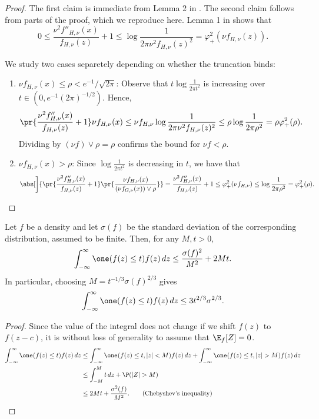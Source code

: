 \documentclass[12pt, reqno]{amsart}
\newcommand{\invphi}{\varphi_{+}}
\numberwithin{equation}{section}
\begin{document}
\begin{refsection}
\begin{appendices}
\begin{proof}
    The first claim is immediate from Lemma 2 in \citet{jiang2020general}.
    The second claim follows from parts of the proof, which we reproduce here. Lemma 1 in 
    \citet{jiang2020general}
    shows that \[
0 \le \frac{
\nu^2 f''_{H, \nu}(x)}{f_{H, \nu}(z)} + 1 \le {\log \frac{1}{2\pi \nu^2 f_
{H,\nu}(z)^2}} = {\invphi^2(\nu f_{H, \nu}(z))}.
    \]

We study two cases separetely depending on whether the truncation binds:
\begin{enumerate}[wide]
  \item $\nu f_
{H,\nu}(x) \le \rho < e^{-1}/\sqrt{2\pi}$: Observe that $t \log \frac{1}{2\pi t^2}$ is
increasing over $t\in (0, e^{-1} (2\pi)^
    {-1/2})$. Hence, \[
\pr{\frac{
\nu^2 f''_{H, \nu}(x)}{f_{H, \nu}(z)} + 1} \nu f_{H, \nu}(x)
\le \nu f_{H, \nu} \log \frac{1}{2\pi \nu^2 f_{H,\nu}(z)^2}
\le \rho \log \frac{1}{2\pi
\rho^2} = \rho \varphi_+^2(\rho).
    \]
    Dividing by $(\nu f) \vee \rho = \rho$ confirms the bound for $\nu f < \rho$.
    \item 
    $\nu f_
{H,\nu}(x) > \rho$:  Since $\log \frac{1}{2\pi t^2}$ is decreasing in $t$, we have
that \[
\abs[\bigg]{\pr{\frac{
\nu^2 f''_{H, \nu}(x)}{f_{H, \nu}(z)} + 1} \pr{\frac{\nu f_{H, \nu}(x)}{(\nu f_{
G, \nu}(x)) \vee \rho}}} =  {\frac{
\nu^2 f''_{H, \nu}(x)}{f_{H, \nu}(z)} + 1} \le \invphi^2(\nu f_{H,\nu}) \le
\log \frac{1}{2\pi \rho^2} = \varphi_+^2(\rho). \qedhere
    \]
\end{enumerate}
\end{proof}





\begin{lemma}
\label{lemma:chebyshev}

Let $f$ be a density and let $\sigma(f)$ be the standard deviation of the corresponding
distribution, assumed to be finite. Then, for any $M, t > 0$,
\[
\int_{-\infty}^{\infty} \one (f(z) \le t) f(z) \,dz \le \frac{\sigma(f)^2}{M^2} + 2Mt.
\]
In particular, choosing $M = t^{-1/3}\sigma(f)^{2/3}$ gives \[
\int_{-\infty}^{\infty} \one (f(z) \le t) f(z) \,dz \le 3 t^{2/3}\sigma^{2/3}.
\]
\end{lemma}

\begin{proof}
Since the value of the integral does not change if we shift $f(z)$ to $f(z-c)$, it is
without loss of generality to assume that $\E_f[Z] = 0$.
\begin{align*}
\int_{-\infty}^{\infty} \one (f(z) \le t) f(z) \,dz &\le \int_{-\infty}^{\infty} \one (f(z)
\le t, |z| < M) f(z) \,dz  + \int_{-\infty}^{\infty} \one (f(z) \le t, |z| > M) f(z)
\,dz
\\
&\le \int_{-M}^M t\, dz + \P(|Z| > M)
\\
&\le 2Mt + \frac{\sigma^2(f)}{M^2}. \tag{Chebyshev's inequality}
\end{align*}
\end{proof}



\end{appendices}
\end{refsection}
\end{document}
